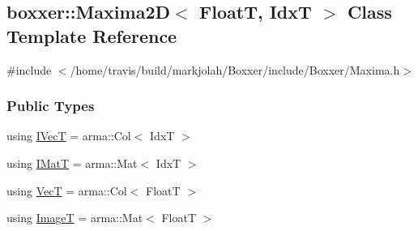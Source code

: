 \hypertarget{classboxxer_1_1Maxima2D}{}\subsection{boxxer\+:\+:Maxima2D$<$ FloatT, IdxT $>$ Class Template Reference}
\label{classboxxer_1_1Maxima2D}


{\ttfamily \#include $<$/home/travis/build/markjolah/\+Boxxer/include/\+Boxxer/\+Maxima.\+h$>$}

\subsubsection*{Public Types}
\begin{DoxyCompactItemize}
\item 
using \hyperlink{classboxxer_1_1Maxima2D_a7396e4c9e917dfca02a7763e9f14bd41}{I\+VecT} = arma\+::\+Col$<$ IdxT $>$
\item 
using \hyperlink{classboxxer_1_1Maxima2D_a8b90b97357c1bdf671e833446e15903b}{I\+MatT} = arma\+::\+Mat$<$ IdxT $>$
\item 
using \hyperlink{classboxxer_1_1Maxima2D_a23c658a4a2d6f05fd405d6cdd4f8070b}{VecT} = arma\+::\+Col$<$ FloatT $>$
\item 
using \hyperlink{classboxxer_1_1Maxima2D_ac6ececb6be39bc2fb15904134da4dafb}{ImageT} = arma\+::\+Mat$<$ FloatT $>$
\end{DoxyCompactItemize}
